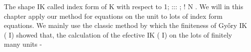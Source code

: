 \documentclass[11pt,a4paper]{article}
\begin{document}
The shape IK called index form of K with respect to 1; ::: ; ! N .
We will in this chapter apply our method for equations on the unit to lots of index form equations.
We mainly use the classic method by which the finiteness of Gy\H{o}ry IK ( I) showed that, the calculation of the efective IK ( I) on the lots of finitely many units -
\end{document}
